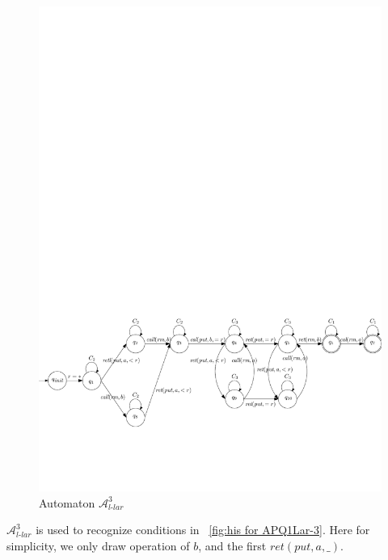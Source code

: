 \begin{figure}[htbp]
  \centering
  \includegraphics[width=1 \textwidth]{figures/PIC_AUTO_PQ1Lar-rppr.pdf}
  \caption{Automaton $\mathcal{A}_{\textit{l-lar}}^3$}
  \label{fig:automata APQ1Lar-3}
\end{figure}


$\mathcal{A}_{\textit{l-lar}}^3$ is used to recognize conditions in \figurename~\ref{fig:his for APQ1Lar-3}. Here for simplicity, we only draw operation of $b$, and the first $\textit{ret}(\textit{put},a,\_)$.


